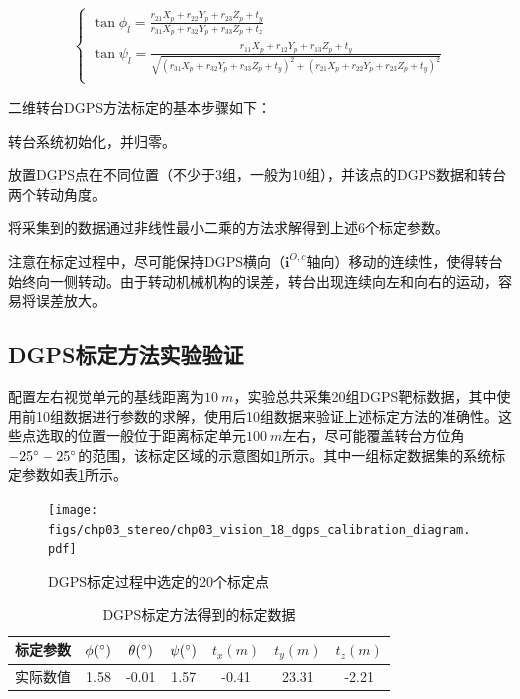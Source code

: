 \begin{equation}
\left\{ \begin{gathered}
\tan \phi_l= \frac{r_{21}X_p + r_{22}Y_p + r_{23}Z_p + t_y}{r_{31}X_p + r_{32}Y_p + r_{33}Z_p + t_z} \\
\tan \psi_l= \frac{r_{11}X_p + r_{12}Y_p + r_{13}Z_p + t_y}{\sqrt{(r_{31}X_p + r_{32}Y_p + r_{33}Z_p + t_y)^2+(r_{21}X_p + r_{22}Y_p + r_{23}Z_p + t_y)^2} }\\
\end{gathered}  \right.
\end{equation}

二维转台DGPS方法标定的基本步骤如下：
\begin{compactenum}
	\item
	转台系统初始化，并归零。
	\item
	放置DGPS点在不同位置（不少于3组，一般为10组），并该点的DGPS数据和转台两个转动角度。
	\item
	将采集到的数据通过非线性最小二乘的方法求解得到上述6个标定参数。
\end{compactenum}
注意在标定过程中，尽可能保持DGPS横向（$\mathbf{i}^{O,c}$轴向）移动的连续性，使得转台始终向一侧转动。由于转动机械机构的误差，转台出现连续向左和向右的运动，容易将误差放大。

\subsection{DGPS标定方法实验验证}
配置左右视觉单元的基线距离为$10\ m$，实验总共采集20组DGPS靶标数据，其中使用前10组数据进行参数的求解，使用后10组数据来验证上述标定方法的准确性。这些点选取的位置一般位于距离标定单元$100\ m$左右，尽可能覆盖转台方位角$-25\degree-25\degree$的范围，该标定区域的示意图如\ref{fig:chp03_vision_18_dgps_calibration_diagram}所示。其中一组标定数据集的系统标定参数如表\ref{label:dgps_calibration}所示。

\begin{figure}[htb]
	\centering
	\texttt{[image: figs/chp03\_stereo/chp03\_vision\_18\_dgps\_calibration\_diagram.pdf]}	
	\caption{DGPS标定过程中选定的20个标定点}
	\label{fig:chp03_vision_18_dgps_calibration_diagram}
\end{figure}

\begin{table}[htb]
	\centering
	\caption{DGPS标定方法得到的标定数据}
	\label{label:dgps_calibration}
	\begin{tabular}{ccccccc}
		\hline
		标定参数 & $\phi (\degree)$ & $\theta (\degree)$ & $\psi (\degree)$ & $t_x (m)$ & $t_y(m)$ & $t_z(m)$ \\ \hline
		实际数值 & 1.58             & -0.01              & 1.57             & -0.41     & 23.31   & -2.21    \\ \hline
	\end{tabular}
\end{table}

